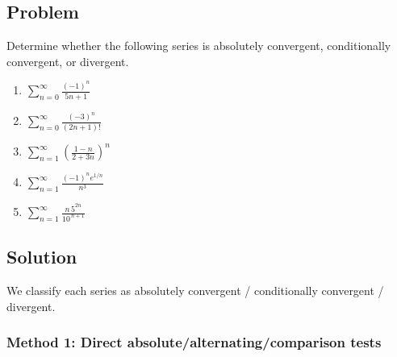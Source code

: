 \documentclass[12pt]{article}
\begin{document}
\subsection*{Problem}
Determine whether the following series is absolutely convergent, conditionally convergent, or divergent.
\begin{enumerate}[label=(\alph*)]
  \item \(\displaystyle \sum_{n=0}^{\infty}\frac{(-1)^n}{5n+1}\)
  
  \item \(\displaystyle \sum_{n=0}^{\infty}\frac{(-3)^n}{(2n+1)!}\)
  
  \item \(\displaystyle \sum_{n=1}^{\infty}\left(\frac{1-n}{2+3n}\right)^{n}\)
  
  \item \(\displaystyle \sum_{n=1}^{\infty}\frac{(-1)^n e^{1/n}}{n^{3}}\)
  
  \item \(\displaystyle \sum_{n=1}^{\infty}\frac{n\,5^{2n}}{10^{\,n+1}}\)
\end{enumerate}

\subsection*{Solution}
We classify each series as absolutely convergent / conditionally convergent / divergent.

\subsubsection*{Method 1: Direct absolute/alternating/comparison tests}
\end{document}
